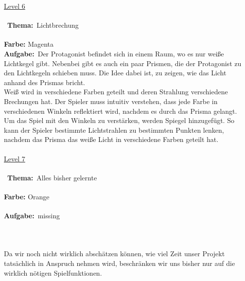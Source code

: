 \documentclass[10pt,a4paper,notitlepage]{report}
\begin{document}
	\underline{Level 6}\\\\\
	\textbf{Thema:}\
	Lichtbrechung
	\\\\
	\textbf{Farbe:} Magenta\
	\
	\\
	\textbf{Aufgabe:}\
	Der Protagonist befindet sich in einem Raum, wo es nur weiße Lichtkegel gibt. Nebenbei gibt es auch ein paar Prismen, die der Protagonist zu den Lichtkegeln 		schieben muss. Die Idee dabei ist, zu zeigen, wie das Licht anhand des Prismas bricht.\\
	Weiß wird in verschiedene Farben geteilt und deren Strahlung verschiedene Brechungen hat. Der Spieler muss intuitiv verstehen, dass jede Farbe in 			verschiedenen Winkeln reflektiert wird, nachdem es durch das Prisma gelangt.\\
	Um das Spiel mit den Winkeln zu verstärken, werden Spiegel hinzugefügt. So kann der Spieler bestimmte Lichtstrahlen zu bestimmten Punkten lenken, 
	nachdem das Prisma das weiße Licht in verschiedene Farben geteilt hat.
	\\\\
	\underline{Level 7}\\\\\
	\textbf{Thema:}\
	Alles bisher gelernte
	\\\\
	\textbf{Farbe:} Orange\
	\\\\
	\textbf{Aufgabe:}\
	missing
	\\
	\clearpage\
	\marginpar{\vspace{3.0mm} \color{orange}\rule{0.8mm}{53.3mm} \\[3mm] \color{hellorange}\rule{0.8mm}{170mm}}
	\\
	\
	\\\\
	\Text
		Da wir noch nicht wirklich abschätzen können, wie viel Zeit unser Projekt tatsächlich in Anspruch nehmen wird, 
	beschränken wir uns bisher nur auf die wirklich nötigen Spielfunktionen. \\
\end{document}
